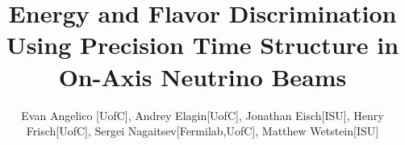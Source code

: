 \documentclass[preprint,12pt]{elsarticle}
\begin{document}
\begin{frontmatter}


\title{Energy and Flavor Discrimination Using Precision Time Structure in On-Axis Neutrino Beams}



\def\LAPPDTM{LAPPD\textsuperscript{TM}~}
\def\LAPPDTMs{LAPPD\textsuperscript{TM}s~}
\newcommand{\Kzero}{\mbox{$\rm K^{0}$~}}


\author{Evan Angelico [UofC], Andrey Elagin[UofC], Jonathan Eisch[ISU], Henry Frisch[UofC], Sergei Nagaitsev[Fermilab,UofC], Matthew Wetstein[ISU]}
\address[UofC]{Enrico Fermi Institute, University of Chicago, Chicago IL 60637}
\address[Fermilab]{Fermi National Laboratory, Batavia IL 60510}
\address[ISU]{Matt to Fill in}


\end{frontmatter}
\end{document}
